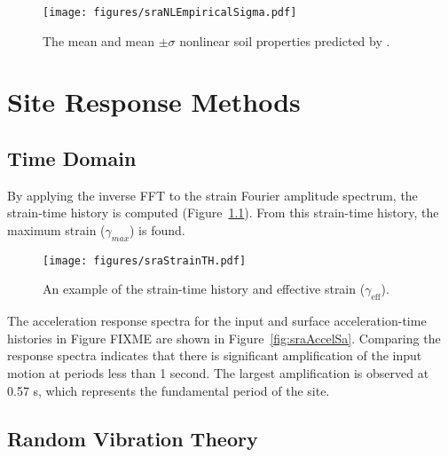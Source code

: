 \documentclass[11pt]{report}
\begin{document}
\begin{figure}[tb]
  \begin{center}
	\texttt{[image: figures/sraNLEmpiricalSigma.pdf]}
  \end{center}
  \caption{The mean and mean $\pm\sigma$ nonlinear soil properties predicted by \citet{darendeli:01}.}
  \label{fig:sraNLEmpiricalSigma}
\end{figure}
\clearpage 

\chapter{Site Response Methods}\label{ch:srm}
\section{Time Domain}
By applying the
inverse FFT to the strain Fourier amplitude spectrum, the strain-time history is computed
(Figure~\ref{fig:sraStrainTH}).  From this strain-time history, the maximum strain ($\gamma_{max}$)
is found.  


\begin{figure}[tb]
  \begin{center}
	\texttt{[image: figures/sraStrainTH.pdf]}
  \end{center}
  \caption{An example of the strain-time history and effective strain ($\gamma_{\mathrm{eff}}$).}
  \label{fig:sraStrainTH}
\end{figure}

The acceleration response spectra for the input and surface acceleration-time histories in Figure
FIXME are shown in Figure~\ref{fig:sraAccelSa}.  Comparing the response spectra indicates that there
is significant amplification of the input motion at periods less than 1 second.  The largest
amplification is observed at 0.57 s, which represents the fundamental period of the site.


\section{Random Vibration Theory}


\newpage
{} 


\newpage
{} 
\printindex
\end{document}
